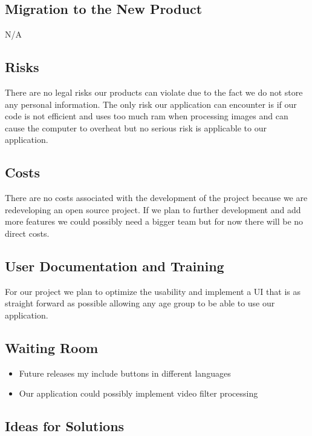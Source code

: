 \documentclass[12pt, titlepage]{article}
\begin{document}
\subsection{Migration to the New Product}

N/A

\subsection{Risks}

There are no legal risks our products can violate due to the fact we do not store any personal information. The only risk our application can encounter is if our code is not efficient and uses too much ram when processing images and can cause the computer to overheat but no serious risk is applicable to our application.

\subsection{Costs}

There are no costs associated with the development of the project because we are redeveloping an open source project. If we plan to further development and add more features we could possibly need a bigger team but for now there will be no direct costs.

\subsection{User Documentation and Training}

For our project we plan to optimize the usability and implement a UI that is as straight forward as possible allowing any age group to be able to use our application.

\subsection{Waiting Room}

\begin{itemize}	
\item Future releases my include buttons in different languages\\
\item Our application could possibly implement video filter  processing\\
\end{itemize}

\subsection{Ideas for Solutions}
\end{document}

